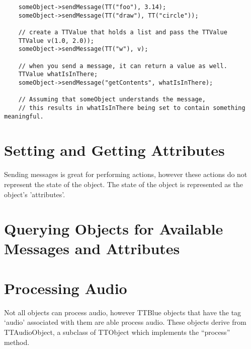 \begin{small}\begin{verbatim}
	someObject->sendMessage(TT("foo"), 3.14);
	someObject->sendMessage(TT("draw"), TT("circle"));

	// create a TTValue that holds a list and pass the TTValue
	TTValue v(1.0, 2.0));
	someObject->sendMessage(TT("w"), v);
	
	// when you send a message, it can return a value as well.
	TTValue whatIsInThere;
	someObject->sendMessage("getContents", whatIsInThere);
	
	// Assuming that someObject understands the message, 
	// this results in whatIsInThere being set to contain something meaningful.	
\end{verbatim}\end{small}





\section{Setting and Getting Attributes}

Sending messages is great for performing actions, however these actions do not represent the state of the object.
The state of the object is represented as the object's 'attributes'.



\section{Querying Objects for Available Messages and Attributes}



\section{Processing Audio}

Not all objects can process audio, however TTBlue objects that have the tag ‘audio’ associated with them are able process audio.  These objects derive from TTAudioObject, a subclass of TTObject which implements the “process” method.




